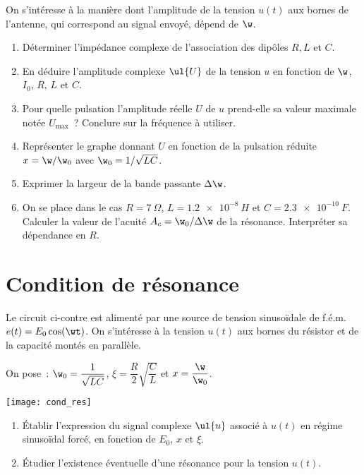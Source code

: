 \documentclass[a4paper, 12pt, final, garamond]{book}
\begin{document}
On s'intéresse à la manière dont l'amplitude de la tension $u(t)$ aux
bornes de l'antenne, qui correspond au signal envoyé, dépend de
$\w$.

\begin{enumerate}
    \item Déterminer l'impédance complexe de l'association des dipôles $R,L$ et
        $C$.
    \item En déduire l'amplitude complexe $\ul{U}$ de la tension $u$ en fonction
        de $\w$, $I_0$, $R$, $L$ et $C$.
    \item Pour quelle pulsation l'amplitude réelle $U$ de $u$ prend-elle sa
        valeur maximale notée $U_\text{max}$~? Conclure sur la fréquence à
        utiliser.
    \item Représenter le graphe donnant $U$ en fonction de la pulsation réduite
        $x=\w/\w_0$ avec $\w_0=1/\sqrt{LC}$.
    \item Exprimer la largeur de la bande passante $\Delta\w$.
    \item On se place dans le cas $R = \SI{7}{\Omega}$, $L = \SI{1.2e-8}{H}$ et $C =
        \SI{2.3e-10}{F}$. Calculer la valeur de l'acuité $A_c = \w_0/\Delta\w$
        de la résonance. Interpréter sa dépendance en $R$.
\end{enumerate}

\section{Condition de résonance}
\begin{minipage}{0.60\linewidth}
    Le circuit ci-contre est alimenté par une source de tension sinusoïdale de
    f.é.m. $e(t) = E_0 \cos( \wt)$. On s'intéresse à la tension $u(t)$
    aux bornes du résistor et de la capacité montés en parallèle.

    On pose~: $\w_0 =\dfrac{1}{\sqrt{LC}}$, $\xi =
    \dfrac{R}{2}\sqrt{\dfrac{C}{L}}$ et $x = \dfrac{\w}{\w_0}$.
\end{minipage}
\hfill
\begin{minipage}{0.35\linewidth}
    \begin{center}
        \texttt{[image: cond\_res]}
    \end{center}
\end{minipage}

\begin{enumerate}
    \item Établir l'expression du signal complexe $\ul{u}$ associé à
        $u(t)$ en régime sinusoïdal forcé, en fonction de $E_0$, $x$ et
        $\xi$.
    \item Étudier l'existence éventuelle d'une résonance pour la tension
        $u(t)$.
\end{enumerate}
\end{document}
